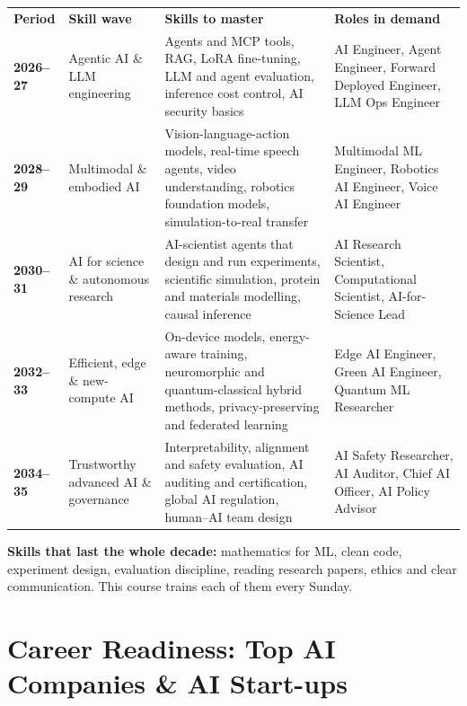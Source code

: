 \documentclass[11pt,a4paper]{article}
\begin{document}
\small
{}
\begin{tabularx}{\linewidth}{@{}L{1.7cm} L{3.3cm} Y L{3.6cm}@{}}
\color{gold}\sffamily\bfseries Period & \color{gold}\sffamily\bfseries Skill wave & \color{gold}\sffamily\bfseries Skills to master & \color{gold}\sffamily\bfseries Roles in demand\\
\textbf{2026--27} & Agentic AI \& LLM engineering  &
  Agents and MCP tools, RAG, LoRA fine-tuning, LLM and agent evaluation, inference cost control, AI security basics &
  AI Engineer, Agent Engineer, Forward Deployed Engineer, LLM Ops Engineer\\
\textbf{2028--29} & Multimodal \& embodied AI &
  Vision-language-action models, real-time speech agents, video understanding, robotics foundation models, simulation-to-real transfer &
  Multimodal ML Engineer, Robotics AI Engineer, Voice AI Engineer\\
\textbf{2030--31} & AI for science \& autonomous research &
  AI-scientist agents that design and run experiments, scientific simulation, protein and materials modelling, causal inference &
  AI Research Scientist, Computational Scientist, AI-for-Science Lead\\
\textbf{2032--33} & Efficient, edge \& new-compute AI &
  On-device models, energy-aware training, neuromorphic and quantum-classical hybrid methods, privacy-preserving and federated learning &
  Edge AI Engineer, Green AI Engineer, Quantum ML Researcher\\
\textbf{2034--35} & Trustworthy advanced AI \& governance &
  Interpretability, alignment and safety evaluation, AI auditing and certification, global AI regulation, human--AI team design &
  AI Safety Researcher, AI Auditor, Chief AI Officer, AI Policy Advisor\\
\end{tabularx}
\normalsize

\begin{goldnote}\textbf{Skills that last the whole decade:} mathematics for ML, clean code, experiment design, evaluation discipline, reading research papers, ethics and clear communication. This course trains each of them every Sunday.\end{goldnote}

\section{Career Readiness: Top AI Companies \& AI Start-ups}
\end{document}
